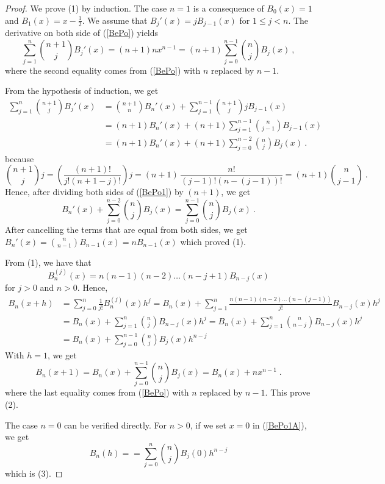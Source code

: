 \begin{proof}
 We prove (1) by induction.  The case $n=1$ is a consequence of
$B_0(x) = 1$ and $\displaystyle B_1(x) = x - \frac{1}{2}$.  We assume
that $B_j'(x) = j B_{j-1}(x)$ for $1 \leq j < n$.  The derivative on both
side of (\ref{BePo}) yields
\begin{equation} \label{BePo1}
\sum_{j=1}^n \binom{n+1}{j} B_j'(x) = (n+1)nx^{n-1}
= (n+1) \sum_{j=0}^{n-1} \binom{n}{j} B_j(x) \ ,
\end{equation}
where the second equality comes from (\ref{BePo}) with $n$ replaced by
$n-1$.

From the hypothesis of induction, we get
\begin{align*}
\sum_{j=1}^n \binom{n+1}{j} B_j'(x)
&= \binom{n+1}{n} B_n'(x) + \sum_{j=1}^{n-1} \binom{n+1}{j} j B_{j-1}(x) \\
&= (n+1) B_n'(x) + (n+1) \sum_{j=1}^{n-1} \binom{n}{j-1} B_{j-1}(x) \\
&= (n+1) B_n'(x) + (n+1) \sum_{j=0}^{n-2} \binom{n}{j} B_{j}(x) \ .
\end{align*}
because
\[
\binom{n+1}{j} j = \left(\frac{(n+1)!}{j!(n+1-j)!}\right) j
= (n+1)\, \frac{n!}{(j-1)!(n-(j-1))!} = (n+1) \binom{n}{j-1} \ .
\]
Hence, after dividing both sides of (\ref{BePo1}) by $(n+1)$, we get
\[
B_n'(x) + \sum_{j=0}^{n-2} \binom{n}{j} B_{j}(x)
= \sum_{j=0}^{n-1} \binom{n}{j} B_j(x) \ .
\]
After cancelling the terms that are equal from both sides, we get
$\displaystyle B_n'(x) = \binom{n}{n-1} B_{n-1}(x) = nB_{n-1}(x)$
which proved (1).

  From (1), we have that
\[
B_n^{(j)}(x) = n(n-1)(n-2)\ldots(n-j+1)B_{n-j}(x)
\]
for $j>0$ and $n>0$.  Hence,
\begin{align}
B_n(x+h) &= \sum_{j=0}^n \frac{1}{j!} B_n^{(j)}(x) h^j
= B_n(x) +
\sum_{j=1}^n \frac{n(n-1)(n-2)\ldots(n-(j-1))}{j!} B_{n-j}(x) h^j
\nonumber \\
&= B_n(x) + \sum_{j=1}^n \binom{n}{j} B_{n-j}(x) h^j
= B_n(x) + \sum_{j=1}^n \binom{n}{n-j} B_{n-j}(x) h^j \nonumber \\
&= B_n(x) + \sum_{j=0}^{n-1} \binom{n}{j} B_{j}(x) h^{n-j}
\label{BePo1A}
\end{align}
With $h=1$, we get
\[
B_n(x+1) = B_n(x) + \sum_{j=0}^{n-1} \binom{n}{j} B_{j}(x)
= B_n(x) + nx^{n-1} \; .
\]
where the last equality comes from (\ref{BePo}) with $n$ replaced by
$n-1$.  This prove (2).

 The case $n=0$ can be verified directly.  For $n>0$, if we
set $x=0$ in (\ref{BePo1A}), we get
\[
B_n(h) = = \sum_{j=0}^n \binom{n}{j} B_j(0) h^{n-j}
\]
which is (3).


\end{proof}
